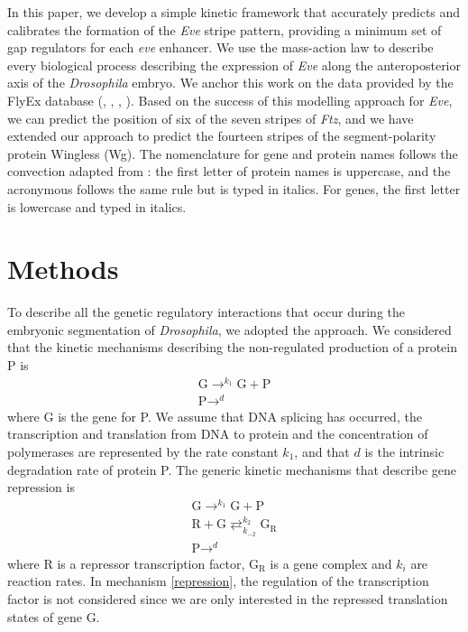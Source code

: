 \documentclass[final,authoryear, 5p, times]{elsarticle}
\begin{document}
In this paper, we develop a simple kinetic framework that accurately predicts and calibrates the formation of the \textit{Eve} stripe pattern,  providing a minimum set of gap regulators for each \textit{eve} enhancer. We use the mass-action law to describe every biological process describing the expression of \textit{Eve} along the anteroposterior axis of the \textit{Drosophila} embryo. We anchor this work on the data provided by the FlyEx database (\cite{Kozlov}, \cite{Myasnikova}, \cite{Poustelnikova}, \cite{Pisarev}). Based on the success of this modelling approach for \textit{Eve}, we can predict the position of six of the seven stripes of \textit{Ftz}, and we have extended our approach to predict the fourteen stripes of the segment-polarity protein Wingless (Wg).  The nomenclature for gene and protein names follows the convection adapted from \cite[p. ix]{Alber}: the first letter of protein names is uppercase, and the acronymous follows the same rule but is typed in italics. For genes, the first letter is lowercase and typed in italics.

\section{Methods}
\label{sec:imple}

To describe all the genetic regulatory interactions that occur during the embryonic segmentation of \textit{Drosophila}, we adopted the \cite{ALVES2005429} approach. We considered that the kinetic mechanisms describing the non-regulated production of a protein P is
\begin{equation} \label{free-prod}
        \begin{array}{l}\displaystyle 
             \text{G}\mathop{\longrightarrow}^{k_{1}} \text{G} + \text{P} \\ \displaystyle
             \text{P} \mathop{\longrightarrow}^{d}
        \end{array}
\end{equation}
where G is the gene for P. We assume that DNA splicing has occurred,  the transcription and translation from DNA to protein and the concentration of polymerases are represented by the rate constant $k_1$, and that $d$ is the intrinsic degradation rate of protein P.  
The generic kinetic mechanisms that describe gene repression is
    \begin{equation} \label{repression}
      \begin{array}{l}\displaystyle 
            \text{G} \mathop{\longrightarrow}^{k_{1}} \text{G} + \text{P} \\ \displaystyle 
          	\text{R} + \text{G} \mathop{\rightleftarrows}^{k_{2}}_{k_{-2}} \text{G}_{\text{R}} \\ \displaystyle
            \text{P} \mathop{\longrightarrow}^{d} 
         \end{array}
    \end{equation}
where R is a repressor transcription factor, G$_\text{R}$ is a gene complex and $k_i$ are reaction rates.  
In mechanism \eqref{repression}, the regulation of the transcription factor is not considered since we are only interested in the repressed translation states of gene G.
\end{document}
